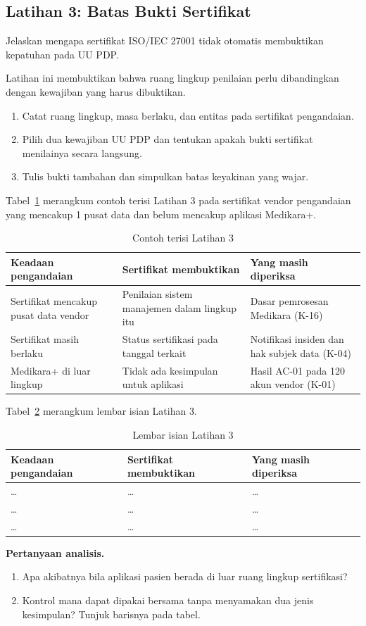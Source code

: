 \subsection*{Latihan 3: Batas Bukti Sertifikat}

Jelaskan mengapa sertifikat ISO/IEC 27001 tidak otomatis membuktikan kepatuhan pada UU PDP.

Latihan ini membuktikan bahwa ruang lingkup penilaian perlu dibandingkan dengan kewajiban yang harus dibuktikan.
\begin{enumerate}
  \item Catat ruang lingkup, masa berlaku, dan entitas pada sertifikat pengandaian.
  \item Pilih dua kewajiban UU PDP dan tentukan apakah bukti sertifikat menilainya secara langsung.
  \item Tulis bukti tambahan dan simpulkan batas keyakinan yang wajar.
\end{enumerate}

Tabel~\ref{tab:ch03-lat3-contoh} merangkum contoh terisi Latihan 3 pada sertifikat vendor pengandaian yang mencakup 1
pusat data dan belum mencakup aplikasi Medikara+.
\begin{table}[!htb]
  \centering\small
  \caption{Contoh terisi Latihan 3}\label{tab:ch03-lat3-contoh}
  \begin{tabularx}{\textwidth}{|>{\raggedright\arraybackslash}p{}|>{\raggedright\arraybackslash}X|>{\raggedright\arraybackslash}X|}
    \hline
    \textbf{Keadaan pengandaian} & \textbf{Sertifikat membuktikan} & \textbf{Yang masih diperiksa} \\ \hline
    Sertifikat mencakup pusat data vendor & Penilaian sistem manajemen dalam lingkup itu & Dasar pemrosesan Medikara
    (K-16) \\ \hline
    Sertifikat masih berlaku & Status sertifikasi pada tanggal terkait & Notifikasi insiden dan hak subjek data (K-04)
    \\ \hline
    Medikara+ di luar lingkup & Tidak ada kesimpulan untuk aplikasi & Hasil AC-01 pada 120 akun vendor (K-01) \\ \hline
  \end{tabularx}
\end{table}

Tabel~\ref{tab:ch03-lat3-hasil} merangkum lembar isian Latihan 3.
\begin{table}[!htb]
  \centering\small
  \caption{Lembar isian Latihan 3}\label{tab:ch03-lat3-hasil}
  \begin{tabularx}{\textwidth}{|>{\raggedright\arraybackslash}p{}|>{\raggedright\arraybackslash}X|>{\raggedright\arraybackslash}X|}
    \hline
    \textbf{Keadaan pengandaian} & \textbf{Sertifikat membuktikan} & \textbf{Yang masih diperiksa} \\ \hline
    \dots & \dots & \dots \\ \hline
    \dots & \dots & \dots \\ \hline
    \dots & \dots & \dots \\ \hline
  \end{tabularx}
\end{table}

\textbf{Pertanyaan analisis.}
\begin{enumerate}
  \item Apa akibatnya bila aplikasi pasien berada di luar ruang lingkup sertifikasi?
  \item Kontrol mana dapat dipakai bersama tanpa menyamakan dua jenis kesimpulan? Tunjuk barisnya pada tabel.
\end{enumerate}
